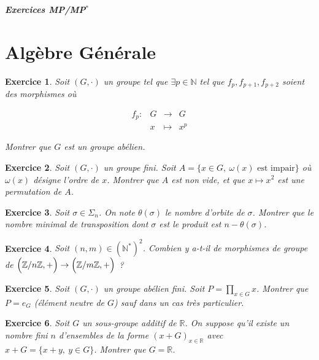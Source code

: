 \documentclass[12pt]{article}
\newtheorem{exercise}{Exercice}[section]
\theoremstyle{remark}
\theoremstyle{remark}
\newcommand{\R}{\mathbb{R}}
\newcommand{\N}{\mathbb{N}}
\newcommand{\Z}{\mathbb{Z}}
\newcommand{\function}[5]{
	$$
	\begin{array}{rccl}
		#1: & #2 & \to & #3 \\
		& #4 & \mapsto & #5
	\end{array}
	$$
}
\begin{document}
\begin{titlepage}
	\centering
	\vspace*{\fill}
	\Huge \textit{\textbf{Exercices MP/MP$^*$}}
	\vspace*{\fill}
\end{titlepage}

\cleardoublepage

\tableofcontents

\cleardoublepage

\section{Algèbre Générale}

\begin{exercise}
	Soit $(G,\cdot)$ un groupe tel que $\exists p\in\N$ tel que
	$f_p,f_{p+1},f_{p+2}$ soient des morphismes où
	\function{f_p}{G}{G}{x}{x^p}
	Montrer que $G$ est un groupe abélien.
\end{exercise}

\begin{exercise}
	Soit $(G,\cdot)$ un groupe fini. Soit $A=\{x\in G,~\omega(x)\text{ est impair}\}$ où
	$\omega(x)$ désigne l'ordre de $x$. Montrer que $A$ est non vide, et que
	$x\mapsto x^2$ est une permutation de $A$.
\end{exercise}

\begin{exercise}
	Soit $\sigma\in\Sigma_n$. On note $\theta(\sigma)$ le nombre d'orbite de
	$\sigma$. Montrer que le nombre minimal de transposition dont $\sigma$ est
	le produit est $n-\theta(\sigma)$.
\end{exercise}

\begin{exercise}
	Soit $(n,m)\in(\N^*)^2$. Combien y a-t-il de morphismes de groupe de
	$\Bigl(\Z/n\Z, +\Bigr)\to\Bigl(\Z/m\Z, +\Bigr)$ ?
\end{exercise}

\begin{exercise}
	Soit $(G,\cdot)$ un groupe abélien fini. Soit $P=\prod_{x\in G}x$. Montrer
	que $P=e_{G}$ (élément neutre de $G$) sauf dans un cas très particulier.
\end{exercise}

\begin{exercise}
	Soit $G$ un sous-groupe additif de $\R$. On suppose qu'il existe un nombre
	fini $n$ d'ensembles de la forme $(x+G)_{x\in\R}$ avec $x+G=\{x+y,~y\in G\}$. Montrer que $G=\R$.
\end{exercise}
\end{document}
